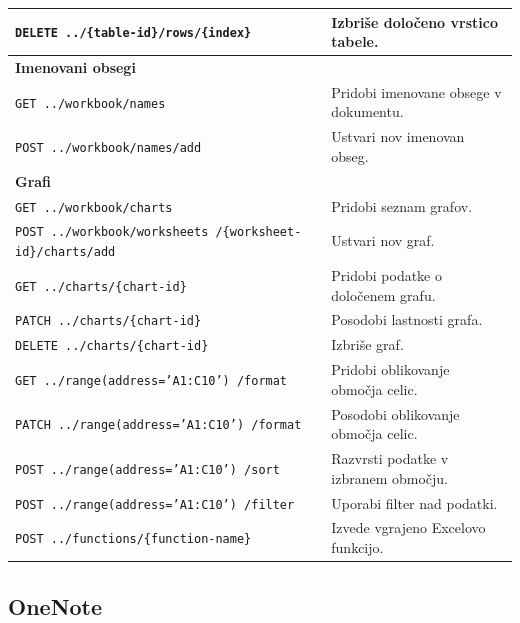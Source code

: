 \documentclass[a4paper, 12pt]{book}
\begin{document}
\begin{longtable}{|p{7cm}|p{7.5cm}|}
\texttt{DELETE ../\{table-id\}/rows/\{index\}} &
Izbriše določeno vrstico tabele. \\
\hline

\multicolumn{2}{|l|}{\textbf{Imenovani obsegi}} \\
\hline

\texttt{GET ../workbook/names} &
Pridobi imenovane obsege v dokumentu. \\
\hline

\texttt{POST ../workbook/names/add} &
Ustvari nov imenovan obseg. \\
\hline

\multicolumn{2}{|l|}{\textbf{Grafi}} \\
\hline

\texttt{GET ../workbook/charts} &
Pridobi seznam grafov. \\
\hline

\texttt{POST ../workbook/worksheets
/\{worksheet-id\}/charts/add} &
Ustvari nov graf. \\
\hline

\texttt{GET ../charts/\{chart-id\}} &
Pridobi podatke o določenem grafu. \\
\hline

\texttt{PATCH ../charts/\{chart-id\}} &
Posodobi lastnosti grafa. \\
\hline

\texttt{DELETE ../charts/\{chart-id\}} &
Izbriše graf. \\
\hline

\texttt{GET ../range(address='A1:C10')
/format} &
Pridobi oblikovanje območja celic. \\
\hline

\texttt{PATCH ../range(address='A1:C10')
/format} &
Posodobi oblikovanje območja celic. \\
\hline

\texttt{POST ../range(address='A1:C10')
/sort} &
Razvrsti podatke v izbranem območju. \\
\hline

\texttt{POST ../range(address='A1:C10')
/filter} &
Uporabi filter nad podatki. \\
\hline

\texttt{POST ../functions/\{function-name\}} &
Izvede vgrajeno Excelovo funkcijo. \\
\hline

\end{longtable}

\subsection{OneNote}
\end{document}

